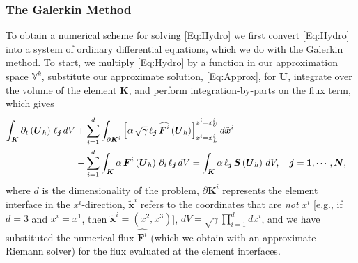 \documentclass[letterpaper]{jpconf}
\renewcommand{\bs}[1]{\boldsymbol{#1}}
\begin{document}
 \subsubsection{The Galerkin Method}
 To obtain a numerical scheme for solving \eqref{Eq:Hydro} we first convert \eqref{Eq:Hydro} into a system of ordinary differential equations, which we do with the Galerkin method. To start, we multiply \eqref{Eq:Hydro} by a function in our approximation space $\mathbb{V}^{k}$, substitute our approximate solution, \eqref{Eq:Approx}, for $\bs{U}$, integrate over the volume of the element $\bs{K}$, and perform integration-by-parts on the flux term, which gives
 \begin{align}\label{Eq:WeakForm1}
     \int_{\bs{K}}\partial_{t}\left(\bs{U}_{h}\right)\,\ell_{\bs{j}}\,dV&+\sum\limits_{i=1}^{d}\int_{\partial\bs{K}^{i}}\left[\alpha\,\sqrt{\gamma}\,\ell_{\bs{j}}\,\widehat{\bs{F}^{i}}\left(\bs{U}_{h}\right)\right]^{x^{i}=x^{i}_{U}}_{x^{i}=x^{i}_{L}}d\tilde{\bs{x}}^{i}&\notag\\
     &-\sum\limits_{i=1}^{d}\int_{\bs{K}}\alpha\,\bs{F}^{i}\left(\bs{U}_{h}\right)\,\partial_{i}\,\ell_{\bs{j}}\,dV=\int_{\bs{K}}\alpha\,\ell_{\bs{j}}\,\bs{S}\left(\bs{U}_{h}\right)\,dV,\hspace{1em}\bs{j}=\bs{1},\cdots,\bs{N},
 \end{align}
where $d$ is the dimensionality of the problem, $\partial\boldsymbol{K}^{i}$ represents the element interface in the $x^{i}$-direction, $\tilde{\bs{x}}^{i}$ refers to the coordinates that are \textit{not} $x^{i}$ [e.g., if $d=3$ and $x^{i}=x^{1}$, then $\tilde{\bs{x}}^{i}=\left(x^{2},x^{3}\right)$], $dV=\sqrt{\gamma}\prod_{i=1}^{d}dx^{i}$, and we have substituted the numerical flux $\widehat{\bs{F}^{i}}$ (which we obtain with an approximate Riemann solver) for the flux evaluated at the element interfaces.
\end{document}
